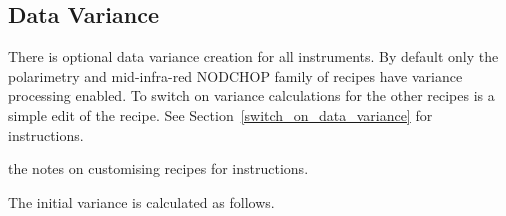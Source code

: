 \documentclass[twoside,11pt]{article}
\newcommand{\htmlref}[2]{#1}
\newenvironment{latexonly}{}{}
\newcommand{\xlabel}[1]{}
\renewcommand{\_}{\texttt{\symbol{95}}}
\begin{document}
\subsection{\xlabel{data_variance}Data Variance\label{data_variance}}

There is optional data variance creation for all instruments.  By
default only the polarimetry and mid-infra-red NOD\_CHOP family of
recipes have variance processing enabled.  To switch on variance
calculations for the other recipes is a simple edit of the recipe.  See
\begin{latexonly}
Section~\ref{switch_on_data_variance} for instructions.
\end{latexonly}
\begin{htmlonly}
the notes on
\htmlref{customising recipes}{switch_on_data_variance}
for instructions.
\end{htmlonly}

The initial variance is calculated as follows.
\end{document}
